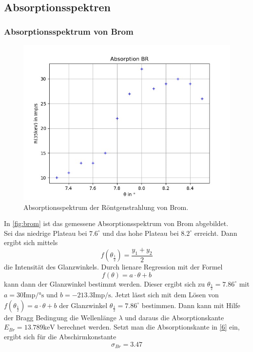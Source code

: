 \subsection{Absorptionsspektren}
\label{subsec:absorptionsspektrum}


\subsubsection*{Absorptionsspektrum von Brom}
\label{brom}

\begin{figure}[H]
  \centering
  \includegraphics{content/Br.png}
  \caption{Absorptionsspektrum der Röntgenstrahlung von Brom.}
  \label{fig:br}
\end{figure}
In \autoref{fig:brom} ist das gemessene Absorptionsspektrum von Brom abgebildet.\\
Sei das niedrige Plateau bei $7.6^\circ$ und das hohe Plateau bei $8.2^\circ$ erreicht. Dann ergibt sich mittels 
\begin{equation*}
  f(\theta_{\frac{1}{2}})=\frac{y_1 +y_2}{2}
\end{equation*}
die Intensität des Glanzwinkels. Durch lienare Regression mit der Formel
\begin{equation}
  f(\theta)=a\cdot\theta + b
  \label{reg}
\end{equation}
kann dann der Glanzwinkel bestimmt werden. Dieser ergibt sich zu $\theta_{\frac{1}{2}}=7.86^\circ$ mit $a=30 \textrm{Imp/°s}$ und $b=-213.3 \textrm{Imp/s}$.
Jetzt lässt sich mit dem Lösen von $f(\theta_{\frac{1}{2}})=a\cdot\theta + b$ der Glanzwinkel $\theta_{\frac{1}{2}}=7.86^\circ$ bestimmen. Dann kann mit Hilfe der Bragg Bedingung die Wellenlänge $\lambda$ und daraus die Absorptionskante $E_{Br}=13.789 \textrm{keV}$ berechnet werden.
Setzt man die Absorptionskante in \eqref{6} ein, ergibt sich für die Abschirmkonstante 
\begin{equation*}
  \sigma_{Br}=3.47
\end{equation*}




